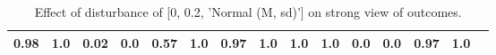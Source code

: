 \begin{table}
\begin{tabular}{l|cc|cc|cc|cc|cc|cc|cc}
\cellcolor{Bittersweet}0.98&\cellcolor{Bittersweet}1.0&\cellcolor{Bittersweet}0.02&\cellcolor{Bittersweet}0.0&0.57&1.0&\cellcolor{Bittersweet}0.97&\cellcolor{Bittersweet}1.0&\cellcolor{Bittersweet}1.0&\cellcolor{Bittersweet}1.0&\cellcolor{Bittersweet}0.0&\cellcolor{Bittersweet}0.0&\cellcolor{Bittersweet}0.97&\cellcolor{Bittersweet}1.0\\\bottomrule\end{tabular}\caption{Effect of disturbance of [0, 0.2, 'Normal (M, sd)'] on strong view of outcomes.}\end{table}